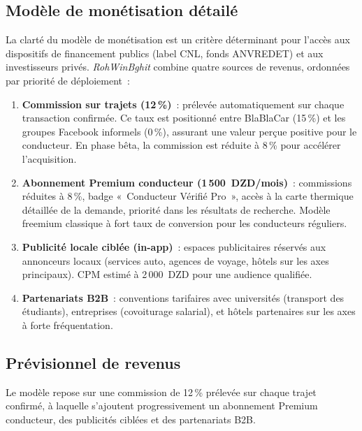 \documentclass[12pt, a4paper, oneside]{report}
\begin{document}
\subsection{Modèle de monétisation détailé}

La clarté du modèle de monétisation est un critère déterminant pour l'accès aux dispositifs de financement publics (label CNL, fonds ANVREDET) et aux investisseurs privés. \textit{RohWinBghit} combine quatre sources de revenus, ordonnées par priorité de déploiement~:

\begin{enumerate}
  \item \textbf{Commission sur trajets (12\,\%)}~: prélevée automatiquement sur chaque transaction confirmée. Ce taux est positionné entre BlaBlaCar (15\,\%) et les groupes Facebook informels (0\,\%), assurant une valeur perçue positive pour le conducteur. En phase bêta, la commission est réduite à 8\,\% pour accélérer l'acquisition.
  \item \textbf{Abonnement Premium conducteur (1\,500~DZD/mois)}~: commissions réduites à 8\,\%, badge «~Conducteur Vérifié Pro~», accès à la carte thermique détaillée de la demande, priorité dans les résultats de recherche. Modèle freemium classique à fort taux de conversion pour les conducteurs réguliers.
  \item \textbf{Publicité locale ciblée (in-app)}~: espaces publicitaires réservés aux annonceurs locaux (services auto, agences de voyage, hôtels sur les axes principaux). CPM estimé à 2\,000~DZD pour une audience qualifiée.
  \item \textbf{Partenariats B2B}~: conventions tarifaires avec universités (transport des étudiants), entreprises (covoiturage salarial), et hôtels partenaires sur les axes à forte fréquentation.
\end{enumerate}

\subsection{Prévisionnel de revenus}

Le modèle repose sur une commission de 12\,\% prélevée sur chaque trajet confirmé, à laquelle s'ajoutent progressivement un abonnement Premium conducteur, des publicités ciblées et des partenariats B2B.
\end{document}
